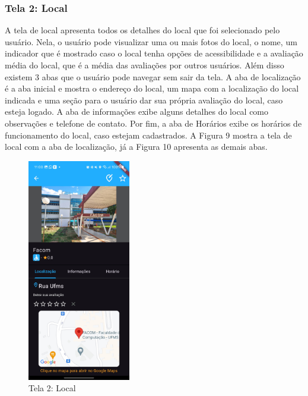     \FloatBarrier

\subsubsection{Tela 2: Local}

    A tela de local apresenta todos os detalhes do local que foi selecionado pelo usuário. Nela, o usuário pode visualizar uma ou mais fotos do local, o nome, um indicador que é mostrado caso o local tenha opções de acessibilidade e a avaliação média do local, que é a média das avaliações por outros usuários. Além disso existem 3 abas que o usuário pode navegar sem sair da tela. A aba de localização é a aba inicial e mostra o endereço do local, um mapa com a localização do local indicada e uma seção para o usuário dar sua própria avaliação do local, caso esteja logado. A aba de informações exibe alguns detalhes do local como observações e telefone de contato. Por fim, a aba de Horários exibe os horários de funcionamento do local, caso estejam cadastrados. A Figura 9 mostra a tela de local com a aba de localização, já a Figura 10 apresenta as demais abas.

    \begin{figure}[h]
        \centering
        \includegraphics[width=0.4\textwidth]{imagens/local.jpg}
        \caption{\scriptsize Tela 2: Local}
        \label{fig:tela2}
    \end{figure}

